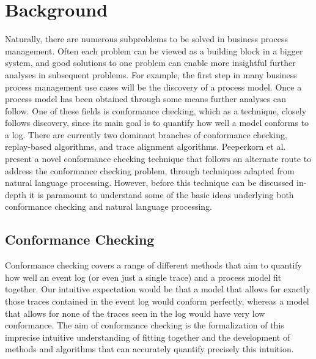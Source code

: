 \documentclass[runningheads]{template/llncs}
\begin{document}
\section{Background}
\label{sec:background}
\color{red}
Naturally, there are numerous subproblems to be solved in business process management.
Often each problem can be viewed as a building block in a bigger system, and good solutions to one problem can enable more insightful further analyses in subsequent problems.
For example, the first step in many business process management use cases will be the discovery of a process model.
Once a process model has been obtained through some means further analyses can follow.
One of these fields is conformance checking, which as a technique, closely follows discovery, since its main goal is to quantify how well a model conforms to a log.
There are currently two dominant branches of conformance checking, replay-based algorithms, and trace alignment algorithms.
Peeperkorn et al. present a novel conformance checking technique that follows an alternate route \cite{PBWe20} to address the conformance checking problem, through techniques adapted from natural language processing.
However, before this technique can be discussed in-depth it is paramount to understand some of the basic ideas underlying both conformance checking and natural language processing. 
\color{black}

\subsection{Conformance Checking}
\label{sub:conformance}
Conformance checking covers a range of different methods that aim to quantify how well an event log (or even just a single trace) and a process model fit together.
Our intuitive expectation would be that a model that allows for exactly those traces contained in the event log would conform perfectly, whereas a model that allows for none of the traces seen in the log would have very low conformance.
The aim of conformance checking is the formalization of this imprecise intuitive understanding of fitting together and the development of methods and algorithms that can accurately quantify precisely this intuition.
\end{document}
